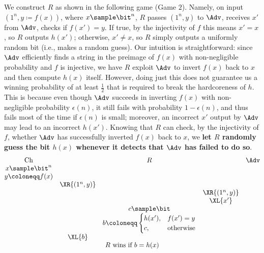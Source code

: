 \begin{answer}[i]
We construct $R$ as shown in the following game (Game $2$). Namely, on input $(1^n, y\coloneqq f(x))$, where $x\sample \bit^n$, $R$ passes $(1^n, y)$ to $\Adv$, receives $x'$ from $\Adv$, checks if $f(x')=y$. If true, by the injectivity of $f$ this means $x'=x$, so $R$ outputs $h(x')$; otherwise, $x'\neq x$, so $R$ simply outputs a uniformly random bit (i.e., makes a random guess). Our intuition is straightforward: since $\Adv$ efficiently finds a string in the preimage of $f(x)$ with non-negligible probability and $f$ is injective, we have $R$ exploit $\Adv$ to invert $f(x)$ back to $x$ and then compute $h(x)$ itself. However, doing just this does not guarantee us  a winning probability of at least $\frac{1}{2}$ that is required to break the hardcoreness of $h$. This is because even though $\Adv$ succeeds in inverting $f(x)$ with non-negligible probability $\epsilon(n)$, it still fails with probability $1-\epsilon(n)$, and thus fails most of the time if $\epsilon(n)$ is small; moreover, an incorrect $x'$ output by $\Adv$ may lead to an incorrect $h(x')$. Knowing that $R$ can check, by the injectivity of $f$, whether $\Adv$ has successfully inverted $f(x)$ back to $x$, we \textbf{let $R$ randomly guess the bit $h(x)$ whenever it detects that $\Adv$ has failed to do so}.
{
    \[
        \begin{array}{@{} c c c c c@{}}
        \text{Ch} & & R & & \Adv \\
        x \sample \bit^n & & & & \\
        y\coloneqq f(x) & & & & \\
        & \XR{(1^n, y)} & & & \\
        & & & \XR{(1^n, y)} & \\
        & & & \XL{x'} & \\
        & & c\sample \bit  & & \\
        & & b\coloneqq \begin{cases}
            h(x'), &f(x')=y\\
            c,     &\textrm{otherwise}
            \end{cases}& & \\
        & \XL{b} & & & \\
        \multicolumn{5}{c}{\text{$R$ wins if $b = h(x)$}}
    \end{array}
    \]
    \label{fig:p4-game2}
}


\end{answer}
